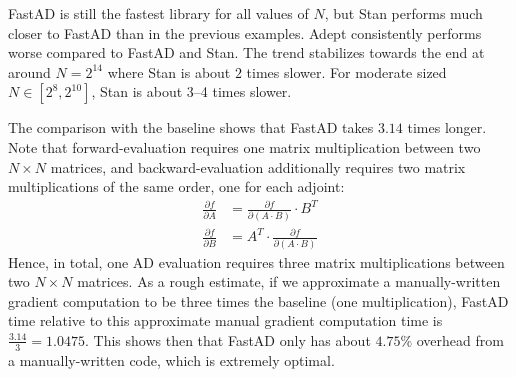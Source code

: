 FastAD is still the fastest library for all values of $N$, 
but Stan performs much closer to FastAD than in the previous examples.
Adept consistently performs worse compared to FastAD and Stan.
The trend stabilizes towards the end at around $N=2^{14}$ where 
Stan is about $ 2$ times slower.
For moderate sized $N \in [2^{8}, 2^{10}]$, Stan is about 3--4 times slower.

The comparison with the baseline shows that FastAD takes $ 3.14$ times longer.
Note that forward-evaluation requires one matrix multiplication between two $N\times N$ matrices,
and backward-evaluation additionally requires two matrix multiplications of the same order,
one for each adjoint:
\begin{align*}
    \frac{\partial f}{\partial A} 
    &= \frac{\partial f}{\partial (A\cdot B)} \cdot B^T \\
    \frac{\partial f}{\partial B} 
    &= A^T \cdot \frac{\partial f}{\partial (A\cdot B)}
\end{align*}
Hence, in total, one AD evaluation requires three matrix multiplications between two $N\times N$ matrices.
As a rough estimate, if we approximate a manually-written gradient computation to be
three times the baseline (one multiplication), FastAD time relative to this approximate manual gradient computation time
is $\frac{3.14}{3} = 1.0475$.
This shows then that FastAD only has about $ 4.75\%$ overhead 
from a manually-written code, which is extremely optimal.
